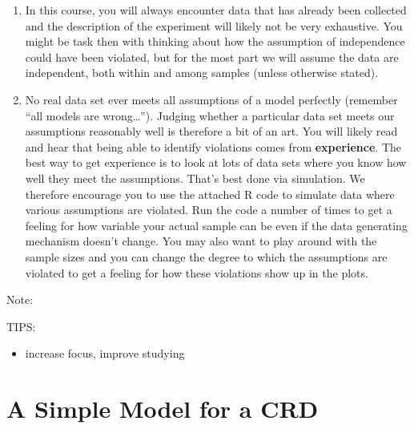 \documentclass[
  letterpaper,
  DIV=11,
  numbers=noendperiod,
  oneside]{scrreprt}
\providecommand{\tightlist}{%
  \setlength{\itemsep}{0pt}\setlength{\parskip}{0pt}}\usepackage{longtable,booktabs,array}
\begin{document}
\begin{tcolorbox}[enhanced jigsaw, toprule=.15mm, colbacktitle=quarto-callout-tip-color!10!white, toptitle=1mm, left=2mm, colframe=quarto-callout-tip-color-frame, bottomrule=.15mm, titlerule=0mm, breakable, opacitybacktitle=0.6, colback=white, coltitle=black, opacityback=0, bottomtitle=1mm, title=\textcolor{quarto-callout-tip-color}{\faLightbulb}\hspace{0.5em}{Note}, rightrule=.15mm, arc=.35mm, leftrule=.75mm]

\begin{enumerate}
\def\labelenumi{\arabic{enumi}.}
\item
  In this course, you will always encounter data that has already been
  collected and the description of the experiment will likely not be
  very exhaustive. You might be task then with thinking about how the
  assumption of independence could have been violated, but for the most
  part we will assume the data are independent, both within and among
  samples (unless otherwise stated).
\item
  No real data set ever meets all assumptions of a model perfectly
  (remember ``all models are wrong\ldots{}''). Judging whether a
  particular data set meets our assumptions reasonably well is therefore
  a bit of an art. You will likely read and hear that being able to
  identify violations comes from \textbf{experience}. The best way to
  get experience is to look at lots of data sets where you know how well
  they meet the assumptions. That's best done via simulation. We
  therefore encourage you to use the attached R code to simulate data
  where various assumptions are violated. Run the code a number of times
  to get a feeling for how variable your actual sample can be even if
  the data generating mechanism doesn't change. You may also want to
  play around with the sample sizes and you can change the degree to
  which the assumptions are violated to get a feeling for how these
  violations show up in the plots.
\end{enumerate}

\end{tcolorbox}

Note:

TIPS:

\begin{itemize}
\tightlist
\item
  increase focus, improve studying
\end{itemize}

\chapter{A Simple Model for a CRD}\label{a-simple-model-for-a-crd}
\end{document}
